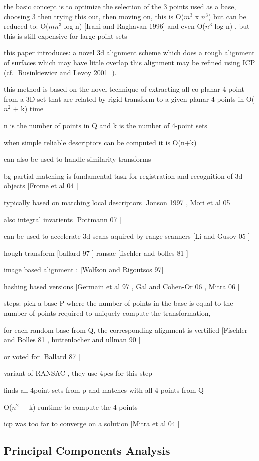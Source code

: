 the basic concept is to optimize the selection of the 3 points used as a base, choosing 3 then trying this out, then moving on,
this is O($m^3$ x $n^3$) but can be reduced to:  O($mn^3$ log n) [Irani and Raghavan \cite{Irani96Combinatorial} 1996] and even O($n^3$ log n) , but this is still expensive for large point sets

this paper introduces:
a novel 3d alignment scheme which does a rough alignment of surfaces which may have little overlap
this alignment may be refined using ICP  (cf. [Rusinkiewicz and Levoy 2001 \cite{Rusinkiewicz01Efficient}]). 

this method is based on the novel technique of extracting all co-planar 4 point from a 3D set that are related by rigid transform to a given planar 4-points in O($n^2$ + k) time

n is the number of points in Q and k is the number of 4-point sets

when simple reliable descriptors can be computed it is 
O(n+k)

can also be used to handle similarity transforms

bg
partial matching is fundamental task for registration and recognition of 3d objects [Frome et al 04 \cite{Frome04Recognizing}]

typically based on matching local descriptors [Jonson 1997 \cite{Johnson97Spin}, Mori \cite{Mori05Efficient} et al 05]

also integral invarients [Pottmann 07 \cite{Pottmann07Principal}]

can be used to accelerate 3d scans aquired by range scanners [Li and Gusov 05 \cite{Li05Multiscale}]

hough transform [ballard 97 \cite{Ballard81Generalizing}] ransac [fischler and bolles 81 \cite{Fischler81Random}]

image based alignment : [Wolfson and Rigoutsos \cite{Wolfson97Geometric} 97]

hashing based versions [Germain et al 97 \cite{Germain97Fingerprint}, Gal and Cohen-Or 06 \cite{Gal06Salient}, Mitra 06 \cite{Mitra04Registration}]

steps: pick a base P where the number of points in the base is equal to the number of points required to uniquely compute the transformation,

for each random base from Q, the corresponding alignment is vertified [Fischler and Bolles 81 \cite{Fischler81Random}, huttenlocher and ullman 90 \cite{Huttenlocher91Fast} ]

or voted for [Ballard 87 \cite{Ballard91Generalizing}]

variant of RANSAC , they use 4pcs for this step

finds all 4point sets from p and matches with all 4 points from Q

O($n^2$ + k) runtime to compute the 4 points


icp was too far to converge on a solution [Mitra et al 04 \cite{Mitra04Registration}]


\subsection{Principal Components Analysis}






